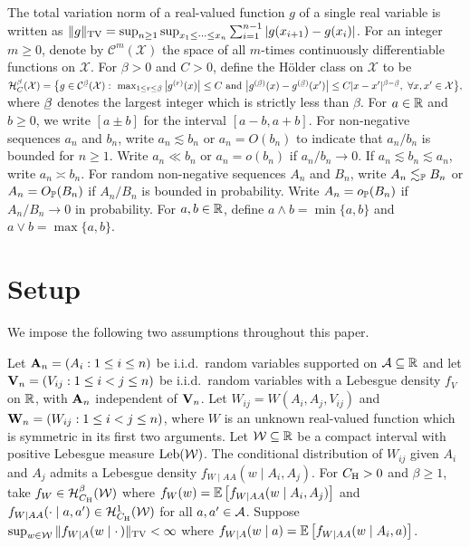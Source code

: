 The total variation norm of a
real-valued function $g$ of a single real variable is
written as
$\|g\|_\TV = \sup_{n \geq 1} \sup_{x_1 \leq \cdots \leq x_n}
\sum_{i=1}^{n-1} |g(x_{i+1}) - g(x_i)|$.
For an integer $m\geq 0$,
denote by $\mathcal{C}^m(\mathcal{X})$
the space of all $m$-times continuously differentiable functions
on $\mathcal{X}$.
For $\beta > 0$ and $C>0$,
define the H\"{o}lder class on $\mathcal{X}$ to be
$\cH^\beta_C(\cX)
=
\big\{
  g \in \cC^{\flbeta}(\cX): \
  \max_{1 \leq r \leq \flbeta}
  \big| g^{(r)}(x) \big| \leq C
  \text{ and }
  \big| g^{(\flbeta)}(x) - g^{(\flbeta)}(x') \big|
  \leq C |x-x'|^{\beta - \flbeta}, \
  \forall x, x' \in \cX
\big\},
$
where $\flbeta$ denotes the largest integer
which is strictly less than $\beta$.
For $a \in \R$ and $b \geq 0$,
we write $[a \pm b]$ for the interval $[a-b, a+b]$.
For non-negative sequences
$a_n$ and $b_n$, write
$a_n \lesssim b_n$ or $a_n = O(b_n)$
to indicate that
$a_n / b_n$ is bounded for $n\geq 1$.
Write $a_n \ll b_n$ or $a_n = o(b_n)$ if $a_n / b_n \to 0$.
If $a_n \lesssim b_n \lesssim a_n$,
write $a_n \asymp b_n$.
For random non-negative sequences
$A_n$ and $B_n$, write
$A_n \lesssim_\P B_n$ or $A_n = O_\P(B_n)$ if
$A_n / B_n$ is bounded in probability.
Write $A_n = o_\P(B_n)$ if $A_n / B_n \to 0$ in probability.
For $a,b \in \R$, define $a\wedge b=\min\{a,b\}$ and
$a \vee b = \max\{a,b\}$.

\section{Setup}\label{sec:kernel_setup}

We impose the following two assumptions throughout this paper.
%
\begin{assumption}[Data generation]\label{ass:kernel_data}\onehalfspacing
  Let $\bA_n = (A_i: 1 \leq i \leq n)$ be i.i.d.\
  random variables supported on $\cA \subseteq \R$
  and let $\bV_n = (V_{i j}: 1 \leq i < j \leq n)$
  be i.i.d.\ random variables with a Lebesgue density $f_V$ on $\R$,
  with $\bA_n$ independent of $\bV_n$.
  Let $W_{i j} = W(A_i, A_j, V_{i j})$
  and $\bW_n = (W_{i j}: 1 \leq i < j \leq n)$,
  where $W$ is an unknown real-valued function
  which is symmetric in its first two arguments.
  Let $\cW \subseteq \R$ be a compact interval
  with positive Lebesgue measure $\Leb(\cW)$.
  The conditional distribution
  of $W_{i j}$ given $A_i$ and $A_j$
  admits a Lebesgue density $f_{W \mid AA}(w \mid A_i, A_j)$.
  For $C_\rH > 0$ and $\beta \geq 1$,
  take $f_W \in \cH^\beta_{C_\rH}(\cW)$ where
  $f_{W}(w) = \E\left[f_{W \mid AA}(w \mid A_i,A_j)\right]$
  and
  $f_{W \mid AA}(\cdot \mid a, a') \in \cH^1_{C_\rH}(\cW)$
  for all $a,a' \in \cA$.
  Suppose
  $\sup_{w \in \cW} \|f_{W \mid A}(w \mid \cdot\,)\|_\TV <\infty$ where
  $f_{W \mid A}(w \mid a) = \E\left[f_{W \mid AA}(w \mid A_i,a)\right]$.
\end{assumption}

